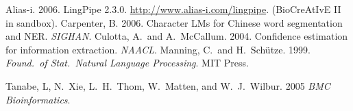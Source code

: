 \documentclass[twoside,11pt]{article}
\begin{document}
\vspace*{-6pt}
\begin{thebibliography}{99}
Alias-i.  2006. LingPipe 2.3.0.
\url{http://www.alias-i.com/lingpipe}.  {\small (BioCreAtIvE II in sandbox).}
Carpenter, B. 2006.  Character LMs for Chinese word
segmentation and NER. {\em SIGHAN}.
Culotta, A.\ and A.~McCallum. 2004.
Confidence estimation for information extraction.
{\em NAACL}.
Manning, C.\ and H.~Sch\"utze.  1999.  {\it Found.\ of Stat.\ Natural Language Processing}.  MIT Press.


Tanabe, L, N.~Xie, L.~H.~Thom, W.~Matten, and W.~J.~Wilbur. 2005
{\it BMC Bioinformatics}.



\end{thebibliography}
\end{document}
